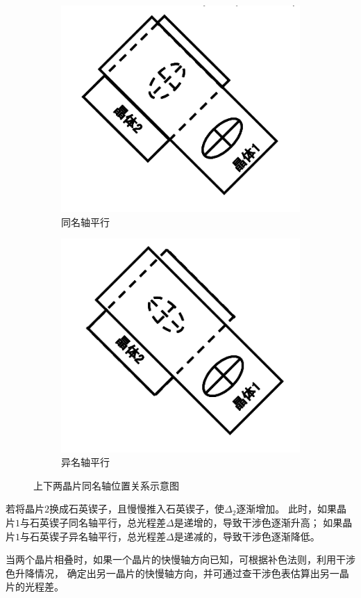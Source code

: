 \documentclass[11pt,a4paper]{article}
\begin{document}
\begin{spacing}{1.3}
\begin{CJK*}{UTF8}{gbsn}
\begin{figure}[htbp]
\begin{subfigure}[b]{0.4\textwidth}
\includegraphics[width=\linewidth]{fig4-1-7a}
\caption{同名轴平行}
\label{fig:4-1-7a}
\end{subfigure}
\begin{subfigure}[b]{0.4\textwidth}
\includegraphics[width=\linewidth]{fig4-1-7b}
\caption{异名轴平行}
\label{fig:4-1-7b}
\end{subfigure}
\caption{上下两晶片同名轴位置关系示意图}\label{fig:4-1-7}
\end{figure} 
若将晶片$2$换成石英锲子，且慢慢推入石英锲子，使$\Delta_2$逐渐增加。
此时，如果晶片$1$与石英锲子同名轴平行，总光程差$\Delta$是递增的，导致干涉色逐渐升高；
如果晶片$1$与石英锲子异名轴平行，总光程差$\Delta$是递减的，导致干涉色逐渐降低。\par
当两个晶片相叠时，如果一个晶片的快慢轴方向已知，可根据补色法则，利用干涉色升降情况，
确定出另一晶片的快慢轴方向，并可通过查干涉色表估算出另一晶片的光程差。


\end{CJK*}
\end{spacing}
\end{document}
